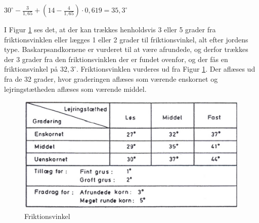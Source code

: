 \begin{center}
	$30^\circ - \frac{3}{1,\!65} + (14 - \frac{4}{1,\!65}) \cdot 0,\!619 = 35,\!3^\circ$
\end{center}

I Figur \ref{fig:friktionsvinkel} ses det, at der kan trækkes henholdsvis 3 eller 5 grader fra friktionsvinklen eller lægges 1 eller 2 grader til friktionsvinkel, alt efter jordens type. Baskarpsandkornene er vurderet til at være afrundede, og derfor trækkes der 3 grader fra den friktionsvinklen der er fundet ovenfor, og der fås en friktionsvinkel på $32,\!3^\circ$. 
\newline
\newline
Friktionsvinklen vurderes ud fra Figur \ref{fig:friktionsvinkel}. Der aflæses ud fra de 32 grader, hvor graderingen aflæses som værende enskornet og lejringstætheden aflæses som værende middel.

\begin{figure}[htbp] \centering
	\begin{minipage}[b]{0.48\textwidth}\centering
		\includegraphics[width=1.2\textwidth]{billeder/friktionsvinkel.png}
		\caption{Friktionsvinkel \citep[ s. 170]{geoteknik}}
		\label{fig:friktionsvinkel}
	\end{minipage}\hfill
\end{figure}
